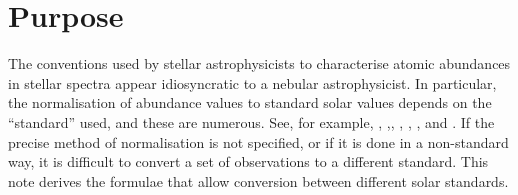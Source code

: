 \section{Purpose}

The conventions used by stellar astrophysicists to characterise atomic abundances in stellar spectra appear idiosyncratic to a nebular astrophysicist.  In particular, the normalisation of abundance values to standard solar values depends on the ``standard'' used, and these are numerous. See, for example, \cite{1989GeCoA..53..197A}, \cite{1998SSRv...85..161G},\cite{2007SSRv..130..105G}, \cite{2009ARA&A..47..481A}, \cite{2010Ap&SS.328..179G}, \cite{2015A&A...573A..25S}, \cite{2015A&A...573A..26S} and \cite{2010Ap&SS.328..179G}.  If the precise method of normalisation is not specified, or if it is done in a non-standard way, it is difficult to convert a set of observations to a different standard.  This note derives the formulae that allow conversion between different solar standards.
  
  